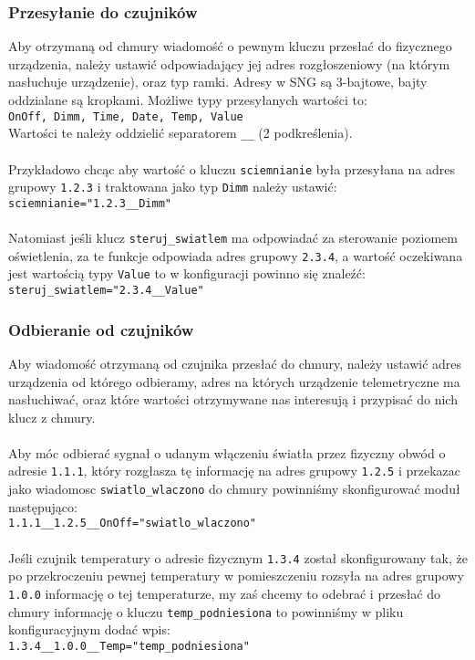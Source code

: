 \documentclass[11pt]{article}
\begin{document}
\subsubsection{Przesyłanie do czujników}
Aby otrzymaną od chmury wiadomość o pewnym kluczu przesłać do fizycznego urządzenia,
należy ustawić odpowiadający jej adres rozgłoszeniowy (na którym nasłuchuje urządzenie), 
oraz typ ramki. Adresy w SNG są 3-bajtowe, bajty oddzialane są kropkami. 
Możliwe typy przesyłanych wartości to:\\
\verb|OnOff, Dimm, Time, Date, Temp, Value|\\
Wartości te należy oddzielić separatorem \verb|__| (2 podkreślenia).\\
\\
Przykładowo chcąc aby wartość o kluczu \verb|sciemnianie| była przesyłana na adres
grupowy \verb|1.2.3| i traktowana jako typ \verb|Dimm| należy ustawić:\\
\verb|sciemnianie="1.2.3__Dimm"|\\
\\
Natomiast jeśli klucz \verb|steruj_swiatlem| ma odpowiadać za sterowanie poziomem oświetlenia,
za te funkcje odpowiada adres grupowy \verb|2.3.4|, a wartość oczekiwana jest wartością typy
\verb|Value| to w konfiguracji powinno się znaleźć:\\
\verb|steruj_swiatlem="2.3.4__Value"|\\


\subsubsection{Odbieranie od czujników}
Aby wiadomość otrzymaną od czujnika przesłać do chmury, należy ustawić adres urządzenia od którego odbieramy,
adres na których urządzenie telemetryczne ma nasłuchiwać, oraz które wartości otrzymywane nas interesują i 
przypisać do nich klucz z chmury.\\
\\
Aby móc odbierać sygnał o udanym włączeniu światła przez fizyczny obwód o adresie \verb|1.1.1|,
który rozgłasza tę informację na adres grupowy \verb|1.2.5| i przekazac jako wiadomosc 
\verb|swiatlo_wlaczono| do chmury powinniśmy skonfigurować moduł następująco:\\
\verb|1.1.1__1.2.5__OnOff="swiatlo_wlaczono"|\\
\\
Jeśli czujnik temperatury o adresie fizycznym \verb|1.3.4| został skonfigurowany tak, że po przekroczeniu
pewnej temperatury w pomieszczeniu rozsyła na adres grupowy \verb|1.0.0| informację o tej temperaturze,
my zaś chcemy to odebrać i przesłać do chmury informację o kluczu \verb|temp_podniesiona| to powinniśmy w
pliku konfiguracyjnym dodać wpis:\\
\verb|1.3.4__1.0.0__Temp="temp_podniesiona"|  
\end{document}
